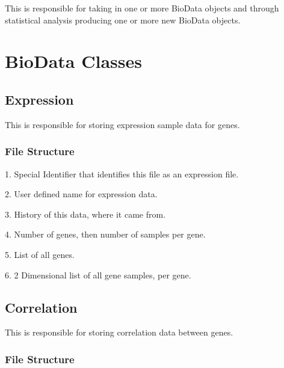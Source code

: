 \documentclass[10pt]{article}
\begin{document}
This is responsible for taking in one or more BioData objects and through 
statistical analysis producing one or more new BioData objects.

\newpage
\section{BioData Classes}

\subsection{Expression}

This is responsible for storing expression sample data for genes.

\subsubsection{File Structure}

\begin{list}{}{}
\item[1.] Special Identifier that identifies this file as an expression file.
\item[2.] User defined name for expression data.
\item[3.] History of this data, where it came from.
\item[4.] Number of genes, then number of samples per gene.
\item[5.] List of all genes.
\item[6.] 2 Dimensional list of all gene samples, per gene.
\end{list}

\subsection{Correlation}

This is responsible for storing correlation data between genes.

\subsubsection{File Structure}
\end{document}
